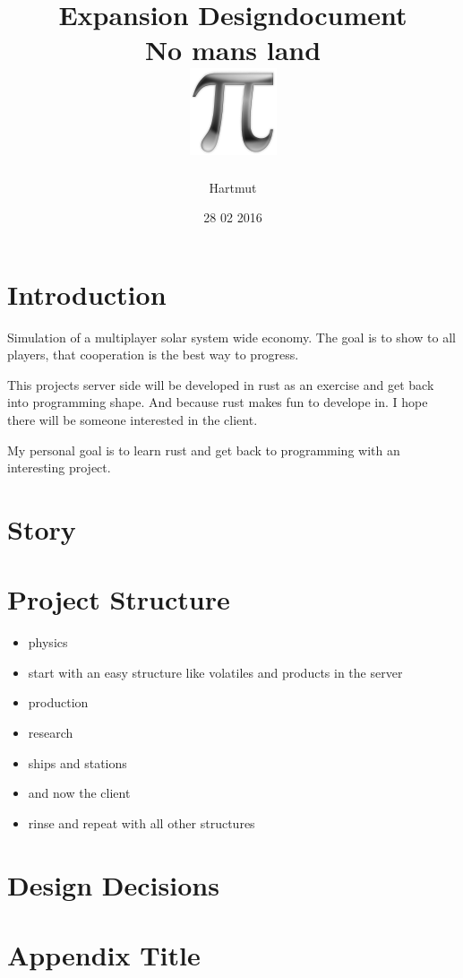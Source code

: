 \documentclass[a4paper,10pt]{book}
\title{
	{Expansion Designdocument}\\
	{\large No mans land}\\
	{\includegraphics{pi-black.png}}
}
\author{Hartmut}
\date{28 02 2016}
\begin{document}
\maketitle

\tableofcontents
\chapter{Introduction}
Simulation of a multiplayer solar system wide economy.
The goal is to show to all players, that cooperation is the best way to progress.

This projects server side will be developed in rust as an exercise and get back into 
programming shape. And because rust makes fun to develope in. I hope there will be someone
interested in the client.

My personal goal is to learn rust and get back to programming with an interesting project. 

\chapter{Story}


\chapter{Project Structure}
\begin{itemize}
 \item physics
 \item start with an easy structure like volatiles and products in the server
 \item production
 \item research
 \item ships and stations
 \item and now the client
 \item rinse and repeat with all other structures
\end{itemize}


\chapter{Design Decisions}


\appendix
\chapter{Appendix Title}

\end{document}
